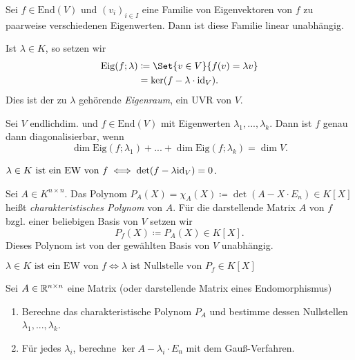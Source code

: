 \documentclass{cheat-sheet}
\newcommand{\End}{\mathrm{End}}
\newcommand{\Eig}{\mathrm{Eig}}
\begin{document}
\begin{satz}
Sei $f \in \End(V)$ und $(v_i)_{i \in I}$ eine Familie von Eigenvektoren von $f$ zu paarweise verschiedenen Eigenwerten. Dann ist diese Familie linear unabhängig.
\end{satz}

\begin{definition}
Ist $\lambda \in K$, so setzen wir
\begin{align*}
\Eig(f; \lambda) &\coloneqq \Set{ v \in V }{ f(v) = \lambda v }\\
&= \ker(f - \lambda \cdot \id_V).
\end{align*}
Dies ist der zu $\lambda$ gehörende \emph{Eigenraum}, ein UVR von $V$.
\end{definition}

\begin{satz}
Sei $V$ endlichdim. und $f \in \End(V)$ mit Eigenwerten $\lambda_1, ..., \lambda_k$. Dann ist $f$ genau dann diagonalisierbar, wenn
\[ \dim \Eig(f; \lambda_1) + ... + \dim \Eig(f; \lambda_k) = \dim V. \]
\end{satz}

\begin{satz}
$\lambda \in K \text{ ist ein EW von } f \iff \det(f - \lambda \mathrm{id}_V) = 0$.
\end{satz}

\begin{definition}
Sei $A \in K^{n \times n}$. Das Polynom $P_A(X) = \chi_A(X) \coloneqq \det(A - X \cdot E_n) \in K[X]$ heißt \emph{charakteristisches Polynom} von $A$. Für die darstellende Matrix $A$ von $f$ bzgl. einer beliebigen Basis von $V$ setzen wir
\[ P_f(X) \coloneqq P_A(X) \in K[X]. \]
Dieses Polynom ist von der gewählten Basis von $V$ unabhängig.
\end{definition}

\begin{satz}
$\lambda \in K \text{ ist ein EW von } f \iff \lambda \text{ ist Nullstelle von } P_f \in K[X]$
\end{satz}

\begin{verf}
Sei $A \in \mathbb{R}^{n \times n}$ eine Matrix (oder darstellende Matrix eines Endomorphismus)
\begin{enumerate}
  \item Berechne das charakteristische Polynom $P_A$ und bestimme dessen Nullstellen $\lambda_1, ..., \lambda_k$.
  \item Für jedes $\lambda_i$, berechne $\ker A - \lambda_i \cdot E_n$ mit dem Gauß-Verfahren.
\end{enumerate}
\end{verf}
\end{document}
